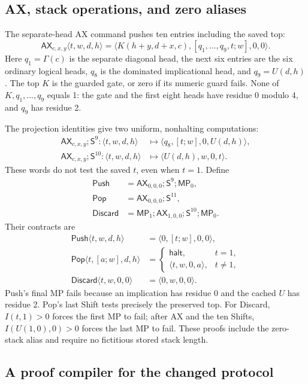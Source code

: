 \documentclass[11pt]{article}
\newcommand{\AX}{\mathsf{AX}}
\newcommand{\MP}{\mathsf{MP}}
\newcommand{\Shift}{\mathsf{S}}
\begin{document}
\subsection{AX, stack operations, and zero aliases}

The separate-head AX command pushes ten entries including the saved top:
\[
\AX_{c,x,y}\langle t,w,d,h\rangle
=\langle K(h+y,d+x,c),[q_1,\ldots,q_9,t;w],0,0\rangle.
\]
Here $q_1=\Gamma(c)$ is the separate diagonal head, the next six entries
are the six ordinary logical heads, $q_8$ is the dominated implicational
head, and $q_9=U(d,h)$. The top $K$ is the guarded gate, or zero if its
numeric guard fails. None of $K,q_1,\ldots,q_9$ equals 1: the gate and
the first eight heads have residue 0 modulo 4, and $q_9$ has residue 2.

The projection identities give two uniform, nonhalting computations:
\begin{align*}
\AX_{c,x,y};\Shift^9:
\langle t,w,d,h\rangle&\longmapsto
\langle q_8,[t;w],0,U(d,h)\rangle,\\
\AX_{c,x,y};\Shift^{10}:
\langle t,w,d,h\rangle&\longmapsto
\langle U(d,h),w,0,t\rangle.
\end{align*}
These words do not test the saved $t$, even when $t=1$.
Define
\begin{align*}
\mathsf{Push}&=\AX_{0,0,0};\Shift^9;\MP_0,\\
\mathsf{Pop}&=\AX_{0,0,0};\Shift^{11},\\
\mathsf{Discard}&=\MP_1;\AX_{1,0,0};\Shift^{10};\MP_0.
\end{align*}
Their contracts are
\begin{align*}
\mathsf{Push}\langle t,w,d,h\rangle&=\langle0,[t;w],0,0\rangle,\\
\mathsf{Pop}\langle t,[a;w],d,h\rangle&=
\begin{cases}\mathsf{halt},&t=1,\\\langle t,w,0,a\rangle,&t\ne1,
\end{cases}\\
\mathsf{Discard}\langle t,w,0,0\rangle&=\langle0,w,0,0\rangle.
\end{align*}
Push's final MP fails because an implication has residue 0 and the cached
$U$ has residue 2. Pop's last Shift tests precisely the preserved top.
For Discard, $I(t,1)>0$ forces the first MP to fail; after AX and the ten
Shifts, $I(U(1,0),0)>0$ forces the last MP to fail. These proofs include
the zero-stack alias and require no fictitious stored stack length.

\subsection{A proof compiler for the changed protocol}
\end{document}
